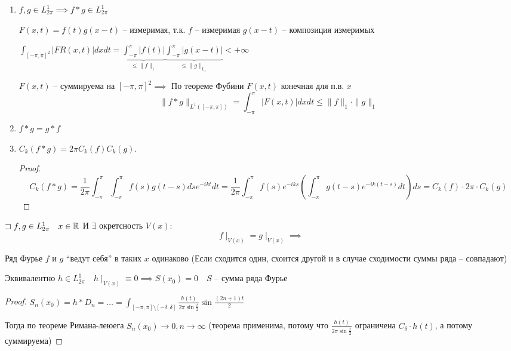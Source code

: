 \begin{property}
    \begin{enumerate}
        \item $f, g\in L^1_{2\pi} \implies f\ast g\in L^1_{2\pi}$

        $F(x,t) = f(t) g(x-t)$ -- измеримая, т.к. $f$ -- измеримая $g(x-t)$ -- композиция измеримых

        $\int_{\left[ -\pi, \pi \right]^2 } \left| FR(x,t) \right|dxdt = \underbrace{\int_{-\pi}^{\pi}|f(t)|}_{\leqslant \|f\|_1} \underbrace{\int_{-\pi}^{\pi} |g(x - t)|}_{\leqslant \|g\|_{L_1}} <+\infty  $

    $F(x,t)$ -- суммируема на $\left[ -\pi, \pi \right] ^2 \implies $ По теореме Фубини $F(x,t)$ конечная для п.в. $x$
    \[\|f\ast g\|_{L^1([-\pi, \pi])} = \int_{-\pi}^{\pi} |F(x,t)|dxdt \leqslant \|f\|_1 \cdot \|g\|_1\]
    \item $f\ast g = g\ast f$

    \item $C_k(f \ast g) = 2\pi C_k (f) C_k(g)$.
    \begin{proof}
        \[ C_k(f \ast g) = \dfrac{1}{2\pi}\int_{-\pi}^\pi \int_{-\pi}^\pi f(s) g(t - s) ds e^{-ikt} dt = \dfrac{1}{2\pi} \int_{-\pi}^\pi f(s) e^{-iks} \left( \int_{-\pi}^\pi g(t - s) e^{-ik (t -s) } dt \right) ds = C_k(f) \cdot 2\pi \cdot C_k(g) \]
    \end{proof}
\end{enumerate}

\begin{theorem}

    $\sqsupset f, g\in L^1_{2\pi}\quad x\in \mathbb{R}$ И $\exists $ окретсность $V(x):$
    \[f\mid_{V(x)} = g\mid_{V(x)} \implies \]

    Ряд Фурье $f$ и $g$ ``ведут себя'' в таких $x$ одинаково (Если сходится один, схоится другой и в случае сходимости суммы ряда -- совпадают)

    Эквивалентно $h\in L^1_{2\pi}\quad h\mid_{V(x)}\equiv 0 \implies S(x_0) = 0\quad S$ -- сумма ряда Фурье
\end{theorem}
\begin{proof}
    $S_n(x_0)= h \ast D_n= \ldots = \int_{[-\pi, \pi]\setminus [-\delta, \delta]}\frac{h(t)}{2\pi\sin \frac{t}{2}} \sin \frac{(2n+1)t}{2}$

    Тогда по теореме Римана-леюега $S_n(x_0) \to 0, n\to \infty $ (теорема применима, потому что  $\frac{h(t)}{2\pi \sin \frac{t}{2}}$ ограничена $C_\delta\cdot h(t)$, а потому суммируема)
\end{proof}

\end{property}

